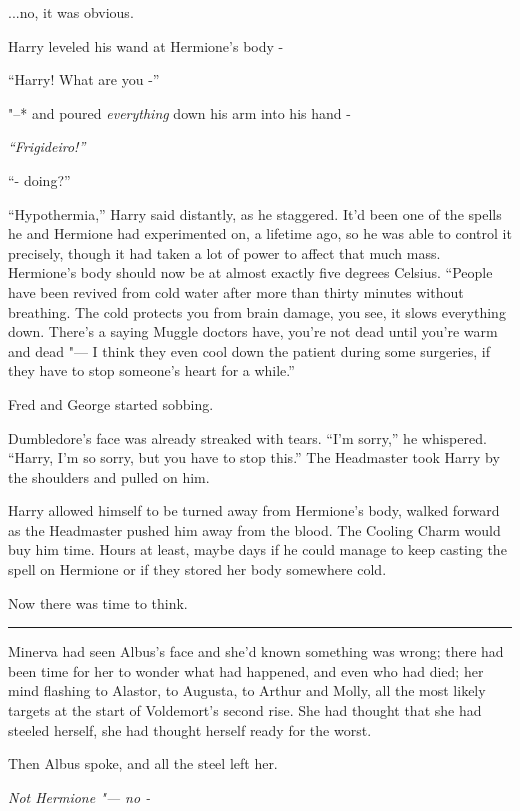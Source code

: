 ...no, it was obvious.

Harry leveled his wand at Hermione's body -

``Harry! What are you -''

"--* and poured \emph{everything} down his arm into his hand -

\emph{``Frigideiro!''}

``- doing?''

``Hypothermia,'' Harry said distantly, as he staggered. It'd been one of
the spells he and Hermione had experimented on, a lifetime ago, so he
was able to control it precisely, though it had taken a lot of power to
affect that much mass. Hermione's body should now be at almost exactly
five degrees Celsius. ``People have been revived from cold water after
more than thirty minutes without breathing. The cold protects you from
brain damage, you see, it slows everything down. There's a saying Muggle
doctors have, you're not dead until you're warm and dead "--- I think they
even cool down the patient during some surgeries, if they have to stop
someone's heart for a while.''

Fred and George started sobbing.

Dumbledore's face was already streaked with tears. ``I'm sorry,'' he
whispered. ``Harry, I'm so sorry, but you have to stop this.'' The
Headmaster took Harry by the shoulders and pulled on him.

Harry allowed himself to be turned away from Hermione's body, walked
forward as the Headmaster pushed him away from the blood. The Cooling
Charm would buy him time. Hours at least, maybe days if he could manage
to keep casting the spell on Hermione or if they stored her body
somewhere cold.

Now there was time to think.

\begin{center}\rule{3in}{0.4pt}\end{center}

Minerva had seen Albus's face and she'd known something was wrong; there
had been time for her to wonder what had happened, and even who had
died; her mind flashing to Alastor, to Augusta, to Arthur and Molly, all
the most likely targets at the start of Voldemort's second rise. She had
thought that she had steeled herself, she had thought herself ready for
the worst.

Then Albus spoke, and all the steel left her.

\emph{Not Hermione "--- no -}

